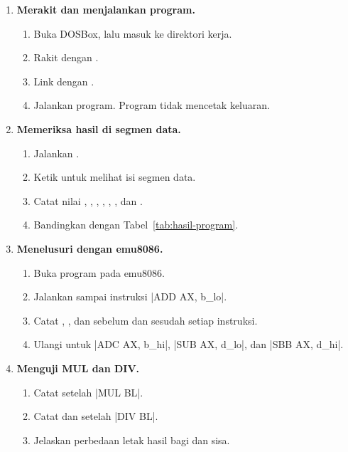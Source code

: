 \begin{enumerate}
    \item \textbf{Merakit dan menjalankan program.}
    \begin{enumerate}
        \item Buka DOSBox, lalu masuk ke direktori kerja.
        \item Rakit dengan .
        \item Link dengan .
        \item Jalankan program. Program tidak mencetak keluaran.
    \end{enumerate}

    \item \textbf{Memeriksa hasil di segmen data.}
    \begin{enumerate}
        \item Jalankan .
        \item Ketik  untuk melihat isi segmen
              data.
        \item Catat nilai , ,
              , , ,
              , dan .
        \item Bandingkan dengan Tabel~\ref{tab:hasil-program}.
    \end{enumerate}

    \item \textbf{Menelusuri dengan emu8086.}
    \begin{enumerate}
        \item Buka program pada emu8086.
        \item Jalankan  sampai instruksi
              \lstasm|ADD AX, b_lo|.
        \item Catat , , dan  sebelum dan
              sesudah setiap instruksi.
        \item Ulangi untuk \lstasm|ADC AX, b_hi|,
              \lstasm|SUB AX, d_lo|, dan \lstasm|SBB AX, d_hi|.
    \end{enumerate}

    \item \textbf{Menguji MUL dan DIV.}
    \begin{enumerate}
        \item Catat  setelah \lstasm|MUL BL|.
        \item Catat  dan  setelah \lstasm|DIV BL|.
        \item Jelaskan perbedaan letak hasil bagi dan sisa.
    \end{enumerate}


\end{enumerate}
